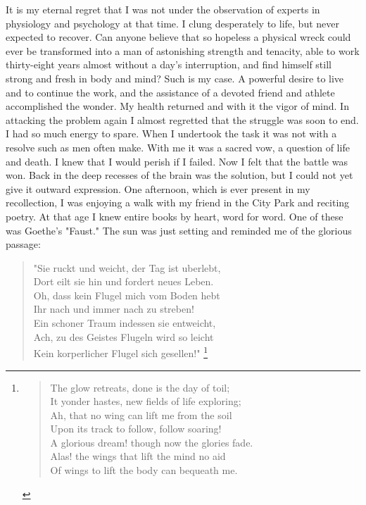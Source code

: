 \documentclass[a4paper,12pt,english,twoside,openright]{memoir}
\begin{document}
It is my eternal regret that I was not under the observation of experts in physiology and 
psychology at that time.  I clung desperately to life, but never expected to recover.  Can anyone 
believe that so hopeless a physical wreck could ever be transformed into a man of astonishing 
strength and tenacity, able to work thirty-eight years almost without a day's interruption, and find 
himself still strong and fresh in body and mind? Such is my case.  A powerful desire to live and to 
continue the work, and the assistance of a devoted friend and athlete accomplished the wonder.  
My health returned and with it the vigor of mind.  In attacking the problem again I almost regretted 
that the struggle was soon to end.  I had so much energy to spare.  When I undertook the task it 
was not with a resolve such as men often make.  With me it was a sacred vow, a question of life 
and death.  I knew that I would perish if I failed.  Now I felt that the battle was won.  Back in the 
deep recesses of the brain was the solution, but I could not yet give it outward expression.  One 
afternoon, which is ever present in my recollection, I was enjoying a walk with my friend in the 
City Park and reciting poetry.  At that age I knew entire books by heart, word for word.  One of 
these was Goethe's "Faust." The sun was just setting and reminded me of the glorious passage:
\begin{verse}
"Sie ruckt und weicht, der Tag ist uberlebt,\\ 
Dort eilt sie hin und fordert neues Leben.\\
Oh, dass kein Flugel mich vom Boden hebt\\
Ihr nach und immer nach zu streben!\\
\vspace{1em}
Ein schoner Traum indessen sie entweicht,\\
Ach, zu des Geistes Flugeln wird so leicht\\
Kein korperlicher Flugel sich gesellen!"
\footnote{\vspace{-2em}
	\begin{verse}
		The glow retreats, done is the day of toil;\\
		It yonder hastes, new fields of life exploring;\\
		Ah, that no wing can lift me from the soil\\
		Upon its track to follow, follow soaring!\\
		\vspace{1em}
		A glorious dream! though now the glories fade.\\
		Alas! the wings that lift the mind no aid\\
		Of wings to lift the body can bequeath me.
	\end{verse}
}		
\end{verse}
\end{document}
